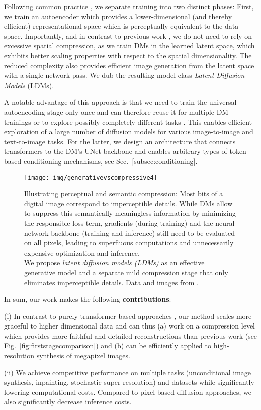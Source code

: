 \documentclass[10pt,twocolumn,letterpaper]{article}
\newcommand{\perceptualcompression}{
\begin{figure}[!t]
	\centering
   \texttt{[image: img/generativevscompressive4]}
\caption{\label{fig:perceptualcompression}
Illustrating perceptual and semantic compression: Most bits of a digital image correspond to imperceptible details. While DMs allow to suppress this semantically meaningless information by minimizing the responsible loss term, gradients (during training) and the neural network backbone (training and inference) still need to be evaluated on all pixels, leading to superfluous computations and unnecessarily expensive optimization and inference.
\\
We propose \emph{latent diffusion models (LDMs)} as an effective generative model and a separate mild compression stage that only eliminates imperceptible details.
Data and images from \cite{DBLP:conf/nips/HoJA20}.\vspace{-1.25em}
}
\end{figure}
}
\begin{document}
Following common practice \cite{DBLP:conf/nips/OordVK17, DBLP:conf/nips/RazaviOV19, DBLP:journals/corr/abs-2012-09841, DBLP:conf/iclr/DaiW19, DBLP:journals/corr/abs-2102-12092}, 
we separate training into two distinct phases: First, we train an autoencoder which provides a lower-dimensional (and thereby efficient) representational space which is perceptually equivalent to the data space.
Importantly, and in contrast to previous work \cite{DBLP:journals/corr/abs-2012-09841, DBLP:journals/corr/abs-2102-12092}, 
we do not need to 
rely on excessive spatial compression, as we train DMs in the learned latent space, which
exhibits better scaling properties with respect to the spatial dimensionality. 
The reduced complexity also provides efficient image generation from the latent space with a single network pass. 
We dub the resulting model class \emph{Latent Diffusion Models} (LDMs).


A notable
 advantage of this approach is that we need to train the universal
    autoencoding stage only once and can therefore reuse it for multiple DM
    trainings or to explore possibly completely different tasks
    \cite{clipguiding}.
This enables efficient exploration of a large number of diffusion models for various image-to-image and text-to-image tasks. 
For the latter, we design an architecture that connects transformers to the DM's UNet backbone \cite{DBLP:conf/miccai/RonnebergerFB15} 
and enables arbitrary types of token-based conditioning mechanisms, see Sec.~\ref{subsec:conditioning}.




\perceptualcompression


\enlargethispage{\baselineskip}
In sum, our work makes the following \textbf{contributions}:

(i) In contrast to purely transformer-based approaches \cite{DBLP:journals/corr/abs-2012-09841, DBLP:journals/corr/abs-2102-12092}, our 
method scales more graceful to higher dimensional data and can thus (a) work on a compression level which provides more faithful and detailed reconstructions than previous work (see Fig.~\ref{fig:firststagecomparison}) and (b) can be efficiently applied to high-resolution synthesis of megapixel images.

(ii) We achieve competitive performance on multiple tasks (unconditional image synthesis, inpainting, stochastic super-resolution)
and datasets while significantly lowering computational costs.
Compared to pixel-based diffusion approaches, we also significantly decrease inference costs.
\end{document}
